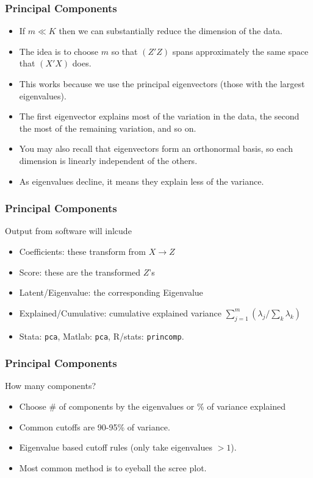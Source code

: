 \begin{frame}
\frametitle{Principal Components}
\begin{itemize}
\item If $m \ll K$ then we can substantially reduce the dimension of the data.
\item The idea is to choose $m$ so that $(Z'Z)$ spans approximately the same space that $(X'X)$ does.
\item This works because we use the \alert{principal eigenvectors} (those with the largest eigenvalues).
\item The first eigenvector explains most of the variation in the data, the second the most of the remaining variation, and so on.
\item You may also recall that eigenvectors form an \alert{orthonormal basis}, so each dimension is linearly independent of the others.
\item As eigenvalues decline, it means they explain less of the variance.
\end{itemize}
\end{frame}

\begin{frame}
\frametitle{Principal Components}
Output from software will inlcude
\begin{itemize}
\item Coefficients: these transform from $X\rightarrow Z$
\item Score: these are the transformed $Z$'s
\item Latent/Eigenvalue: the corresponding Eigenvalue
\item Explained/Cumulative: cumulative explained variance $ \sum_{j=1}^m( \lambda_j / \sum_k \lambda_k)$
\item Stata: \texttt{pca}, Matlab: \texttt{pca}, R/stats: \texttt{princomp}.
\end{itemize}
\end{frame}

\begin{frame}
\frametitle{Principal Components}
How many components?
\begin{itemize}
\item Choose \# of components by the eigenvalues or \% of variance explained
\item Common cutoffs are 90-95\% of variance.
\item Eigenvalue based cutoff rules (only take eigenvalues $ > 1$).
\item Most common method is to eyeball the scree plot.
\end{itemize}
\end{frame}


